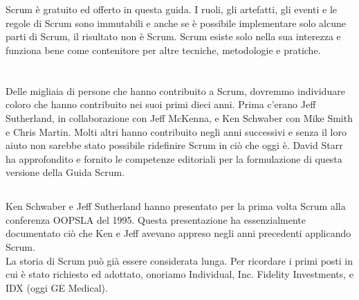 
\section*{\color{Blue}{Conclusioni}}%
\label{sec:conclusion}
Scrum è gratuito ed offerto in questa guida. I ruoli, gli artefatti, gli eventi e le regole di Scrum sono immutabili e anche se \`e 
possibile implementare solo alcune parti di Scrum, il risultato non \`e Scrum. Scrum esiste solo nella sua interezza e funziona bene come 
contenitore per altre tecniche, metodologie e pratiche.

\section*{\color{Blue}{Ringraziamenti}}%
\label{sec:acknowledgements}

\subsection*{\color{SteelBlue}{Persone}}%
\label{sec:people}
Delle migliaia di persone che hanno contribuito a Scrum, dovremmo individuare coloro che hanno contribuito nei suoi
primi dieci anni. Prima c'erano Jeff Sutherland, in collaborazione con Jeff McKenna, e Ken Schwaber con Mike Smith e
Chris Martin. Molti altri hanno contribuito negli anni successivi e senza il loro aiuto non sarebbe stato possibile ridefinire 
Scrum in ci\`o che oggi \`e. David Starr ha approfondito e fornito le competenze editoriali per la formulazione di questa 
versione della Guida Scrum.

\subsection*{\color{SteelBlue}{Storia}}%
\label{sec:history}
Ken Schwaber e Jeff Sutherland hanno presentato per la prima volta Scrum alla conferenza OOPSLA del 1995. Questa presentazione 
ha essenzialmente documentato ci\`o che Ken e Jeff avevano appreso negli anni precedenti applicando Scrum. \newline
\\La storia di Scrum pu\`o gi\`a essere considerata lunga. Per ricordare i primi posti in cui \`e stato richiesto ed adottato, onoriamo Individual, Inc. Fidelity Investments, e IDX (oggi GE Medical).

